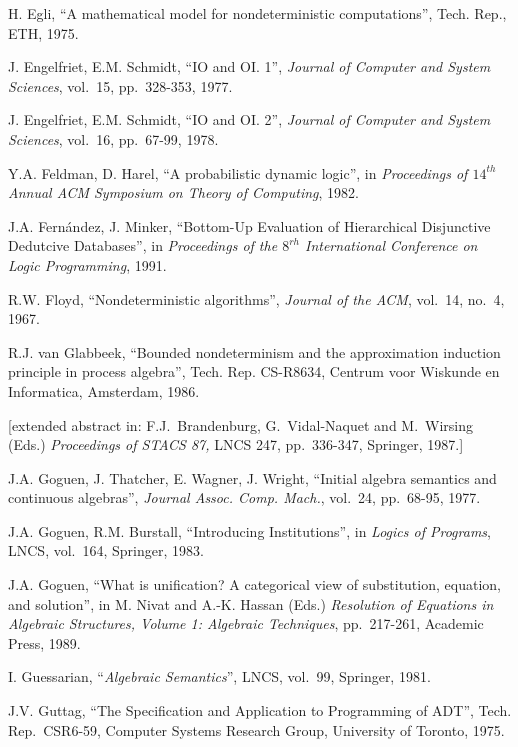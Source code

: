  H. Egli, ``{A mathematical model for nondeterministic 
computations}'', Tech.  Rep., ETH, 1975.

 J. Engelfriet, E.M. Schmidt, ``IO and OI. 1'', {\em 
Journal of Computer and System Sciences}, vol.~15, pp.~328-353, 1977.

 J. Engelfriet, E.M. Schmidt, ``IO and OI. 2'', {\em 
Journal of Computer and System Sciences}, vol.~16, pp.~67-99, 1978.

 Y.A. Feldman, D. Harel, ``A probabilistic dynamic 
logic'', in {\em Proceedings of $14^{th}$ Annual ACM Symposium on Theory of 
Computing}, 1982.

 J.A. Fern\'{a}ndez, J. Minker, ``Bottom-Up Evaluation of 
Hierarchical Disjunctive Dedutcive Databases'', in {\em Proceedings of the 
$8^{rh}$ International Conference on Logic Programming}, 1991.

 R.W. Floyd, ``Nondeterministic algorithms'', {\em 
Journal of the ACM}, vol.~14, no.~4, 1967.

 R.J. van Glabbeek, ``Bounded nondeterminism and the 
approximation induction principle in process algebra'', Tech.  Rep.  
CS-R8634, Centrum voor Wiskunde en Informatica, Amsterdam, 1986.  

{\small{[extended 
abstract in: F.J.~Brandenburg, G.~Vidal-Naquet and M.~Wirsing (Eds.) {\em 
Proceedings of STACS 87,\/} LNCS 247,  pp.~336-347, Springer, 1987.]}\normalsize}

 J.A. Goguen, J. Thatcher, E. Wagner, J. Wright, 
``Initial algebra semantics and continuous algebras'', {\em Journal Assoc.  
Comp.  Mach.}, vol.~24, pp.~68-95, 1977.

 J.A. Goguen, R.M. Burstall, ``Introducing 
Institutions'', in {\em Logics of Programs}, LNCS, vol.~164, Springer, 
1983.

 J.A. Goguen, ``What is unification?  {A} categorical 
view of substitution, equation, and solution'', in M. Nivat and A.-K. 
Hassan (Eds.)  {\em Resolution of Equations in Algebraic Structures, Volume 
1: Algebraic Techniques\/}, pp.~217-261, Academic Press, 1989.

 I. Guessarian, ``{\em Algebraic Semantics}'', LNCS,
vol.~99, Springer, 1981.

 J.V. Guttag, ``The Specification and Application to 
Programming of ADT'', Tech.  Rep.~CSR6-59, Computer Systems Research 
Group, University of Toronto, 1975.

